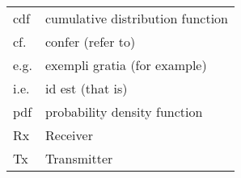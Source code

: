 \begin{longtable}{p{}p{}}
	cdf	&       cumulative distribution function \\
	cf.	&	confer (refer to) \\ 
 	e.g.	& 	exempli gratia (for example) \\
 	i.e.	& 	id est (that is) \\ 
	pdf	&       probability density function \\
 	Rx	& 	Receiver \\
 	Tx	& 	Transmitter

\end{longtable}
  






